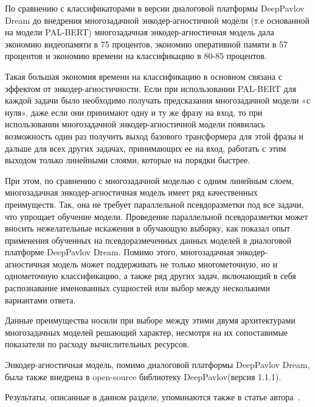 По сравнению с классификаторами в версии диалоговой платформы DeepPavlov Dream до внедрения многозадачной энкодер-агностичной модели (т.е основанной на модели PAL-BERT) многозадачная энкодер-агностичная модель дала экономию видеопамяти в 75 процентов, экономию оперативной памяти в 57 процентов и экономию времени на классификацию в 80-85 процентов.
 
Такая большая экономия времени на классификацию в основном связана с эффектом от энкодер-агностичности. Если при использовании PAL-BERT для каждой задачи было необходимо получать предсказания многозадачной модели «с нуля», даже если они принимают одну и ту же фразу на вход, то при использовании многозадачной энкодер-агностичной модели появилась возможность один раз получить выход базового трансформера для этой фразы и дальше для всех других задачах, принимающих ее на вход, работать с этим выходом только линейными слоями, которые на порядки быстрее.

При этом, по сравнению с многозадачной моделью с одним линейным слоем, многозадачная энкодер-агностичная модель имеет ряд качественных преимуществ. Так, она не требует параллельной псевдоразметки под все задачи, что упрощает обучение модели. Проведение параллельной псевдоразметки может вносить нежелательные искажения в обучающую выборку, как показал опыт применения обученных на псевдоразмеченных данных моделей в диалоговой платформе DeepPavlov Dream. Помимо этого, многозадачная энкодер-агностичная модель может поддерживать не только многометочную, но и однометочную классификацию, а также ряд других задач, включающий в себя распознавание именованных сущностей или выбор между несколькими вариантами ответа.

Данные преимущества носили при выборе между этими двумя архитектурами многозадачных моделей решающий характер, несмотря на их сопоставимые показатели по расходу вычислительных ресурсов.

Энкодер-агностичная модель, помимо диалоговой платформы DeepPavlov Dream, была также внедрена в open-source библиотеку DeepPavlov(версия 1.1.1).

Результаты, описанные в данном разделе, упоминаются также в статье автора~\cite{mtldream}.


